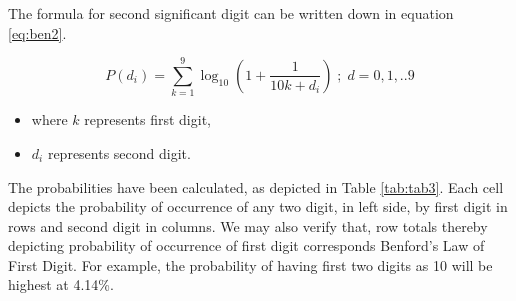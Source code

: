 \documentclass[
]{book}
\providecommand{\tightlist}{%
  \setlength{\itemsep}{0pt}\setlength{\parskip}{0pt}}
\begin{document}
The formula for second significant digit can be written down in equation \eqref{eq:ben2}.

\begin{equation} 
P(d_i) = \sum_{k = 1}^{9}\log_{10}\left(1 + \frac{1}{10k + d_i}\right)\;;\; d = 0,1,..9
\label{eq:ben2}
\end{equation}

\begin{itemize}
\tightlist
\item
  where \(k\) represents first digit,
\item
  \(d_i\) represents second digit.
\end{itemize}

The probabilities have been calculated, as depicted in Table \ref{tab:tab3}. Each cell depicts the probability of occurrence of any two digit, in left side, by first digit in rows and second digit in columns. We may also verify that, row totals thereby depicting probability of occurrence of first digit corresponds Benford's Law of First Digit. For example, the probability of having first two digits as 10 will be highest at 4.14\%.
\end{document}
